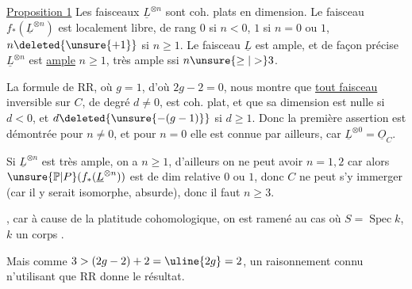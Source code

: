 
\uline{Proposition 1} Les faisceaux $\underline L^{\otimes n}$ sont coh. plats en  dimension. Le faisceau $f_*(\underline L^{\otimes n})$ est localement libre, de rang $0$ si $n<0$, $1$ si $n=0$ ou $1$, $n\deleted{\unsure{+1}}$ si $n\geq1$.  Le faisceau $\underline L$ est ample, et de façon précise $\underline L^{\otimes n}$ est  \uline{ample}   $n\geq1$, très ample ssi $n\unsure{\geq|>}3$.

La formule de RR, où $g=1$, d'où $2g-2=0$, nous montre que \uline{tout faisceau}  inversible sur $C$, de degré  $d\neq0$, est coh. plat, et que sa dimension est  nulle si $d<0$, et $d\deleted{\unsure{-(g-1)}}$ si $d\geq1$. Donc la première assertion est démontrée pour $n\neq0$, et pour $n=0$ elle est connue par ailleurs, car $\underline L^{\otimes0}=\underline O_C$.

Si $\underline L^{\otimes n}$ est très ample, on a $n\geq1$, d'ailleurs on ne peut avoir $n=1,2$ car alors $\unsure{\mathbb P|P}(f_*(\underline L^{\otimes n}))$ est de dim relative $0$ ou $1$, donc $C$ ne peut s'y immerger (car il y serait isomorphe, absurde), donc il faut $n\geq3$.

, car à cause de la platitude cohomologique, on est ramené au cas où $S=\operatorname{Spec}k$, $k$ un corps . 

Mais  comme $3>(2g-2)+2=\uline{2g}=2$, un raisonnement connu n'utilisant que RR donne le résultat.

